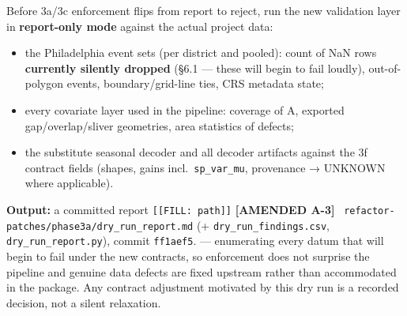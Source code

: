 \documentclass[
  10pt,
]{article}
\providecommand{\tightlist}{%
  \setlength{\itemsep}{0pt}\setlength{\parskip}{0pt}}
\newcommand{\amd}[1]{{\color{amdcolor}\footnotesize\textbf{[AMENDED #1]}}\ }
\begin{document}
Before 3a/3c enforcement flips from report to reject, run the new validation layer in \textbf{report-only mode} against the actual project data:

\begin{itemize}
\tightlist
\item
  the Philadelphia event sets (per district and pooled): count of NaN rows \textbf{currently silently dropped} (§6.1 --- these will begin to fail loudly), out-of-polygon events, boundary/grid-line ties, CRS metadata state;
\item
  every covariate layer used in the pipeline: coverage of A, exported gap/overlap/sliver geometries, area statistics of defects;
\item
  the substitute seasonal decoder and all decoder artifacts against the 3f contract fields (shapes, gains incl.~\texttt{sp\_var\_mu}, provenance → UNKNOWN where applicable).
\end{itemize}

\textbf{Output:} a committed report \texttt{{[}{[}FILL:\ path{]}{]}} \amd{A-3} \texttt{refactor-patches/\allowbreak{}phase3a/\allowbreak{}dry\_run\_report.md} (+ \texttt{dry\_run\_findings.csv}, \texttt{dry\_run\_report.py}), commit \texttt{ff1aef5}. --- enumerating every datum that will begin to fail under the new contracts, so enforcement does not surprise the pipeline and genuine data defects are fixed upstream rather than accommodated in the package. Any contract adjustment motivated by this dry run is a recorded decision, not a silent relaxation.
\end{document}

